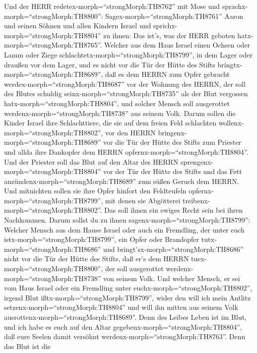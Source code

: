  Und der HERR redetex-morph=``strongMorph:TH8762'' mit Mose
und sprachx-morph=``strongMorph:TH8800'': 
Sagex-morph=``strongMorph:TH8761'' Aaron und seinen Söhnen und allen
Kindern Israel und sprichx-morph=``strongMorph:TH8804'' zu ihnen: Das
ist's, was der HERR geboten hatx-morph=``strongMorph:TH8765''.
 Welcher aus dem Haus Israel einen Ochsen oder Lamm oder
Ziege schlachtetx-morph=``strongMorph:TH8799'', in dem Lager oder
draußen vor dem Lager,  und es nicht vor die Tür der Hütte
des Stifts bringtx-morph=``strongMorph:TH8689'', daß es dem HERRN zum
Opfer gebracht werdex-morph=``strongMorph:TH8687'' vor der Wohnung des
HERRN, der soll des Blutes schuldig seinx-morph=``strongMorph:TH8735''
als der Blut vergossen hatx-morph=``strongMorph:TH8804'', und solcher
Mensch soll ausgerottet werdenx-morph=``strongMorph:TH8738'' aus seinem
Volk.  Darum sollen die Kinder Israel ihre Schlachttiere,
die sie auf dem freien Feld schlachten
wollenx-morph=``strongMorph:TH8802'', vor den HERRN
bringenx-morph=``strongMorph:TH8689'' vor die Tür der Hütte des Stifts
zum Priester und allda ihre Dankopfer dem HERRN
opfernx-morph=``strongMorph:TH8804''.  Und der Priester soll
das Blut auf den Altar des HERRN sprengenx-morph=``strongMorph:TH8804''
vor der Tür der Hütte des Stifts und das Fett
anzündenx-morph=``strongMorph:TH8689'' zum süßen Geruch dem HERRN.
 Und mitnichten sollen sie ihre Opfer hinfort den
Feldteufeln opfernx-morph=``strongMorph:TH8799'', mit denen sie
Abgötterei treibenx-morph=``strongMorph:TH8802''. Das soll ihnen ein
ewiges Recht sein bei ihren Nachkommen.  Darum sollst du zu
ihnen sagenx-morph=``strongMorph:TH8799'': Welcher Mensch aus dem Hause
Israel oder auch ein Fremdling, der unter euch
istx-morph=``strongMorph:TH8799'', ein Opfer oder Brandopfer
tutx-morph=``strongMorph:TH8686''  und
bringt'sx-morph=``strongMorph:TH8686'' nicht vor die Tür der Hütte des
Stifts, daß er's dem HERRN tuex-morph=``strongMorph:TH8800'', der soll
ausgerottet werdenx-morph=``strongMorph:TH8738'' von seinem Volk.
 Und welcher Mensch, er sei vom Haus Israel oder ein
Fremdling unter euchx-morph=``strongMorph:TH8802'', irgend Blut
ißtx-morph=``strongMorph:TH8799'', wider den will ich mein Antlitz
setzenx-morph=``strongMorph:TH8804'' und will ihn mitten aus seinem Volk
ausrottenx-morph=``strongMorph:TH8689''.  Denn des Leibes
Leben ist im Blut, und ich habe es euch auf den Altar
gegebenx-morph=``strongMorph:TH8804'', daß eure Seelen damit versöhnt
werdenx-morph=``strongMorph:TH8763''. Denn das Blut ist die

